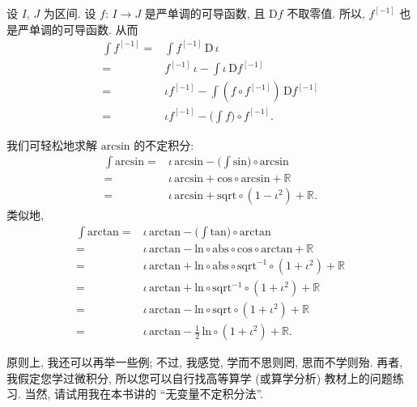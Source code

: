 \begin{example}
    设 $I$, $J$ 为区间. 设 $f$: $I \to J$ 是严单调的可导函数, 且 $\mathrm{D}f$ 不取零值. 所以, $f^{[-1]}$ 也是严单调的可导函数. 从而
    \begin{align*}
        \int {f^{[-1]}}
        = {} & \int {f^{[-1]}\, \mathrm{D}\,\iota}                            \\
        = {} & f^{[-1]}\,\iota - \int {\iota\,\mathrm{D}f^{[-1]}}             \\
        = {} & \iota f^{[-1]} - \int {(f \circ f^{[-1]})\,\mathrm{D}f^{[-1]}} \\
        = {} & \iota f^{[-1]} - \Bigg( \int {f} \Bigg) \circ f^{[-1]}.
    \end{align*}
\end{example}

\begin{example}
    我们可轻松地求解 $\mathrm{arcsin}$ 的不定积分:
    \begin{align*}
        \int {\mathrm{arcsin}}
        = {} & \iota\, \mathrm{arcsin} - \Bigg( \int {\mathrm{sin}} \Bigg) \circ \mathrm{arcsin} \\
        = {} & \iota\, \mathrm{arcsin} + \mathrm{cos} \circ \mathrm{arcsin} + \mathbb{R}         \\
        = {} & \iota\, \mathrm{arcsin} + \mathrm{sqrt} \circ (1 - \iota^2) + \mathbb{R}.
    \end{align*}
    类似地,
    \begin{align*}
        \int {\mathrm{arctan}}
        = {} & \iota\, \mathrm{arctan} - \Bigg( \int {\mathrm{tan}} \Bigg) \circ \mathrm{arctan}                                  \\
        = {} & \iota\, \mathrm{arctan} - \mathrm{ln} \circ \mathrm{abs} \circ \mathrm{cos} \circ \mathrm{arctan} + \mathbb{R}     \\
        = {} & \iota\, \mathrm{arctan} + \mathrm{ln} \circ \mathrm{abs} \circ \mathrm{sqrt}^{-1} \circ (1 + \iota^2) + \mathbb{R} \\
        = {} & \iota\, \mathrm{arctan} + \mathrm{ln} \circ \mathrm{sqrt}^{-1} \circ (1 + \iota^2) + \mathbb{R}                    \\
        = {} & \iota\, \mathrm{arctan} - \mathrm{ln} \circ \mathrm{sqrt} \circ (1 + \iota^2) + \mathbb{R}                         \\
        = {} & \iota\, \mathrm{arctan} - \frac{1}{2}\,\mathrm{ln} \circ (1 + \iota^2) + \mathbb{R}.
    \end{align*}
\end{example}

原则上, 我还可以再举一些例; 不过, 我感觉, 学而不思则罔, 思而不学则殆. 再者, 我假定您学过微积分, 所以您可以自行找高等算学 (或算学分析) 教材上的问题练习. 当然, 请试用我在本书讲的 ``无变量不定积分法''.
